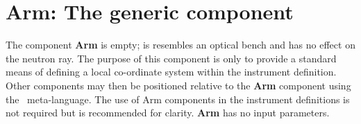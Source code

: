 \section{Arm: The generic component}
\label{explain:arm}

The component {\bf Arm} is empty; is resembles an optical bench
and has no effect on the neutron ray.
The purpose of this component is only to provide a standard
means of defining a local co-ordinate system within the instrument definition.
Other components may then be
positioned relative to the {\bf Arm} component
using the \MCS\ meta-language.
The use of {\rm Arm} components in the instrument definitions
is not required but is recommended for clarity.
{\bf Arm} has no input parameters.


